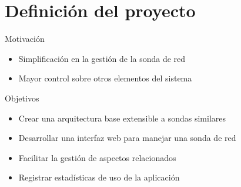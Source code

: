 \section{Definición del proyecto}

\begin{frame}{Motivación}
  \begin{itemize}[<alert@+>]
    \item Simplificación en la gestión de la sonda de red
    \item Mayor control sobre otros elementos del sistema
  \end{itemize}
\end{frame}

\begin{frame}{Objetivos}
  \begin{itemize}[<alert@+>]
    \item Crear una arquitectura base extensible a sondas similares
    \item Desarrollar una interfaz web para manejar una sonda de red
    \item Facilitar la gestión de aspectos relacionados
    \item Registrar estadísticas de uso de la aplicación
  \end{itemize}
\end{frame}
